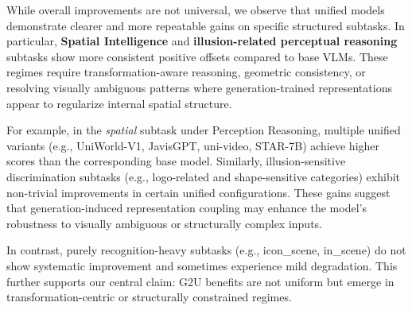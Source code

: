 \documentclass{article}
\theoremstyle{plain}
\theoremstyle{definition}
\theoremstyle{remark}
\begin{document}
While overall improvements are not universal, we observe that unified models demonstrate clearer and more repeatable gains on specific structured subtasks. In particular, \textbf{Spatial Intelligence} and \textbf{illusion-related perceptual reasoning} subtasks show more consistent positive offsets compared to base VLMs. These regimes require transformation-aware reasoning, geometric consistency, or resolving visually ambiguous patterns where generation-trained representations appear to regularize internal spatial structure.

For example, in the \textit{spatial} subtask under Perception Reasoning, multiple unified variants (e.g., UniWorld-V1, JavisGPT, uni-video, STAR-7B) achieve higher scores than the corresponding base model. Similarly, illusion-sensitive discrimination subtasks (e.g., logo-related and shape-sensitive categories) exhibit non-trivial improvements in certain unified configurations. These gains suggest that generation-induced representation coupling may enhance the model’s robustness to visually ambiguous or structurally complex inputs.

In contrast, purely recognition-heavy subtasks (e.g., icon\_scene, in\_scene) do not show systematic improvement and sometimes experience mild degradation. This further supports our central claim: G2U benefits are not uniform but emerge in transformation-centric or structurally constrained regimes.
\end{document}

